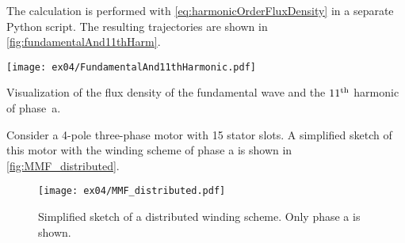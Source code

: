 
\begin{solutionblock}
    The calculation is performed with \eqref{eq:harmonicOrderFluxDensity} in a separate Python script. The resulting trajectories are shown in \autoref{fig:fundamentalAnd11thHarm}.
    \begin{solutionfigure}[ht]
        \centering
        \texttt{[image: ex04/FundamentalAnd11thHarmonic.pdf]}
        \caption{Visualization of the flux density of the fundamental wave and the $11\textsuperscript{th}$ harmonic of phase~a.}
        \label{fig:fundamentalAnd11thHarm}
    \end{solutionfigure}

\end{solutionblock}





Consider a 4-pole three-phase motor with 15 stator slots. A simplified sketch of this motor with the winding scheme of phase a is shown in \autoref{fig:MMF_distributed}.

\begin{figure}[htb]
    \centering
    \texttt{[image: ex04/MMF\_distributed.pdf]}
    \caption{Simplified sketch of a distributed winding scheme. Only phase a is shown.}
    \label{fig:MMF_distributed}
\end{figure}




